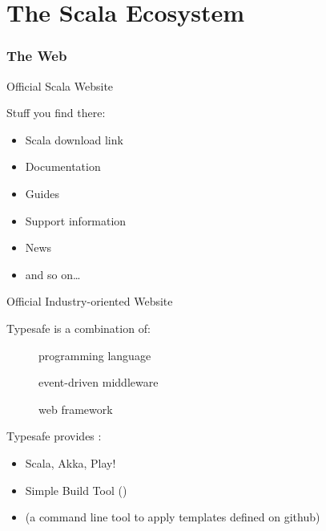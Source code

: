 \part[The Scala Ecosystem]{The Scala Ecosystem}
\section{The Web}
\begin{frame}{Official Scala Website}
\begin{center}
\end{center}
Stuff you find there:
\begin{itemize}
  \item Scala download link
  \item Documentation
  \item Guides
  \item Support information
  \item News
  \item and so on\ldots
\end{itemize}
\end{frame}

\begin{frame}{Official Industry-oriented Website}
\begin{center}
\end{center}
Typesafe is a combination of:
\begin{description}
\item[] programming language
\item[] event-driven middleware
\item[] web framework
\end{description}
\pause
Typesafe provides :
\begin{itemize}
\item Scala, Akka, Play!
\item Simple Build Tool ()
\item {} (a command line tool to
apply templates defined on github)
\end{itemize}
\end{frame}

